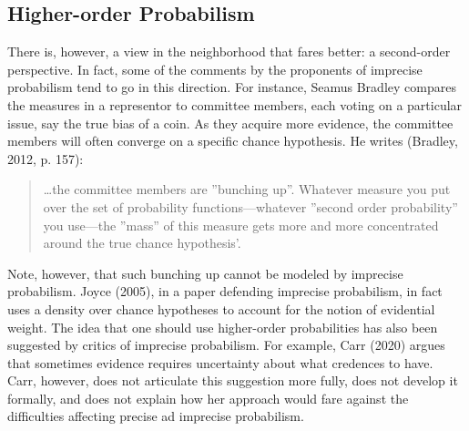 \documentclass[
  10pt,
  dvipsnames,enabledeprecatedfontcommands]{scrartcl}
\begin{document}
\hypertarget{higher-order-probabilism}{%
\subsection{Higher-order Probabilism}\label{higher-order-probabilism}}

There is, however, a view in the neighborhood that fares better: a
second-order perspective. In fact, some of the comments by the
proponents of imprecise probabilism tend to go in this direction. For
instance, Seamus Bradley compares the measures in a representor to
committee members, each voting on a particular issue, say the true bias
of a coin. As they acquire more evidence, the committee members will
often converge on a specific chance hypothesis. He writes (Bradley,
2012, p. 157):

\begin{quote}
\dots the committee members are ''bunching up''. Whatever measure you put over the set of probability functions---whatever ''second order probability'' you use---the ''mass'' of this measure gets more and more concentrated around the true chance hypothesis'.
\end{quote}

\noindent Note, however, that such bunching up cannot be modeled by
imprecise probabilism. Joyce (2005), in a paper defending imprecise
probabilism, in fact uses a density over chance hypotheses to account
for the notion of evidential weight. The idea that one should use
higher-order probabilities has also been suggested by critics of
imprecise probabilism. For example, Carr (2020) argues that sometimes
evidence requires uncertainty about what credences to have. Carr,
however, does not articulate this suggestion more fully, does not
develop it formally, and does not explain how her approach would fare
against the difficulties affecting precise ad imprecise probabilism.
\end{document}
